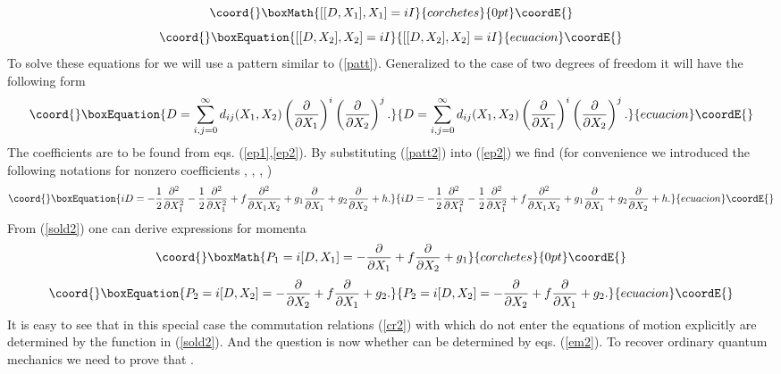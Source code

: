 \documentclass[a4paper,11pt]{article}
\begin{document}
\begin{displaymath}\coord{}\boxMath{
 [ [D,X_1 ],X_1 ]=iI
}{corchetes}{0pt}\coordE{}\end{displaymath}
\begin{equation}\coord{}\boxEquation{
 [ [D,X_2 ],X_2 ]=iI \label{ep2}
}{
 [ [D,X_2 ],X_2 ]=iI }{ecuacion}\coordE{}\end{equation}
To solve these equations for \coordHE{} we will use a pattern similar to
(\ref{patt}). Generalized to the case of two degrees of freedom it
will have the following form
\begin{equation}\coord{}\boxEquation{
D= \sum\limits_{i,j=0}^{\infty} d_{ij}(X_1,X_2)
\left(\frac{\partial}{\partial X_1}\right)^i
\left(\frac{\partial}{\partial X_2}\right)^j. \label{patt2}
}{
D= \sum\limits_{i,j=0}^{\infty} d_{ij}(X_1,X_2)
\left(\frac{\partial}{\partial X_1}\right)^i
\left(\frac{\partial}{\partial X_2}\right)^j. }{ecuacion}\coordE{}\end{equation}
The coefficients \coordHE{} are to be found from eqs.
(\ref{ep1},\ref{ep2}). By substituting (\ref{patt2}) into
(\ref{ep2}) we find (for convenience we introduced the following
notations for nonzero coefficients \coordHE{}, \coordHE{},
\coordHE{}, \coordHE{})
\begin{equation}\coord{}\boxEquation{
iD=-\frac{1}{2}\frac{\partial^2}{\partial X_1^2}-
\frac{1}{2}\frac{\partial^2}{\partial X_1^2}+
f\frac{\partial^2}{\partial X_1 X_2 }+ g_1\frac{\partial}{\partial
X_1}+ g_2\frac{\partial}{\partial X_2}+h. \label{sold2}
}{
iD=-\frac{1}{2}\frac{\partial^2}{\partial X_1^2}-
\frac{1}{2}\frac{\partial^2}{\partial X_1^2}+
f\frac{\partial^2}{\partial X_1 X_2 }+ g_1\frac{\partial}{\partial
X_1}+ g_2\frac{\partial}{\partial X_2}+h. }{ecuacion}\coordE{}\end{equation}
From (\ref{sold2}) one can derive expressions for momenta
\begin{displaymath}\coord{}\boxMath{
P_1=i[D,X_1]=-\frac{\partial}{\partial  X_1}
+f\frac{\partial}{\partial  X_2}+g_1
}{corchetes}{0pt}\coordE{}\end{displaymath}
\begin{equation}\coord{}\boxEquation{
P_2=i[D,X_2]=-\frac{\partial}{\partial  X_2}
+f\frac{\partial}{\partial  X_1}+g_2. \label{momenta2}
}{
P_2=i[D,X_2]=-\frac{\partial}{\partial  X_2}
+f\frac{\partial}{\partial  X_1}+g_2. }{ecuacion}\coordE{}\end{equation}
It is easy to see that in this special case the commutation
relations (\ref{cr2}) with \coordHE{} which do not enter the
equations of motion explicitly are determined by the function \coordHE{}
in (\ref{sold2}). And the question is now whether \coordHE{} can be
determined by eqs. (\ref{em2}). To recover ordinary quantum
mechanics we need to prove that \coordHE{}.
\end{document}

